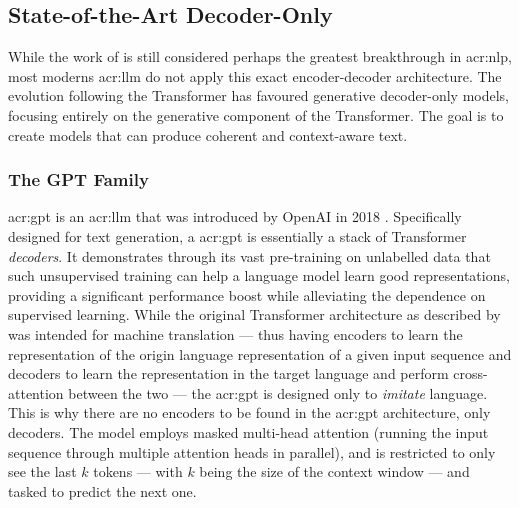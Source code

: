 \subsection[State-of-the-Art Decoder-Only Models]{State-of-the-Art Decoder-Only }
\label{subsec:sota-decoder-only-llms}

While the work of \citeauthor{vaswaniAttentionAllYou2017} is still considered perhaps the greatest breakthrough in \gls{acr:nlp}, most moderns \acrshort{acr:llm} do not apply this exact encoder-decoder architecture. The evolution following the Transformer has favoured generative decoder-only models, focusing entirely on the generative component of the Transformer. The goal is to create models that can produce coherent and context-aware text.

\subsubsection{The GPT Family}
\label{subusubsec:gpt}

\gls{acr:gpt} is an \acrshort{acr:llm} that was introduced by OpenAI in 2018 \citep{radfordImprovingLanguageUnderstanding2018}. Specifically designed for text generation, a \acrshort{acr:gpt} is essentially a stack of Transformer \textit{decoders}. It demonstrates through its vast pre-training on unlabelled data that such unsupervised training can help a language model learn good representations, providing a significant performance boost while alleviating the dependence on supervised learning. While the original Transformer architecture as described by \cite{vaswaniAttentionAllYou2017} was intended for machine translation --- thus having encoders to learn the representation of the origin language representation of a given input sequence and decoders to learn the representation in the target language and perform cross-attention between the two --- the \acrshort{acr:gpt} is designed only to \textit{imitate} language. This is why there are no encoders to be found in the \acrshort{acr:gpt} architecture, only decoders. The model employs masked multi-head attention (running the input sequence through multiple attention heads in parallel), and is restricted to only see the last $k$ tokens --- with $k$ being the size of the context window --- and tasked to predict the next one.

